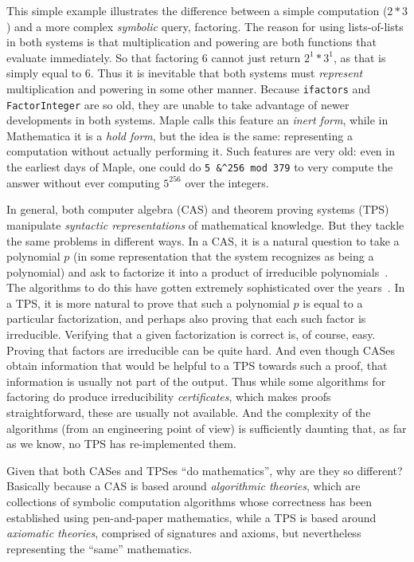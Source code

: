 \documentclass[fleqn]{llncs}
\begin{document}
This simple example illustrates the difference between a simple
computation ($2 * 3$) and a more complex \emph{symbolic} query, factoring.
The reason for using lists-of-lists in both systems is that multiplication
and powering are both functions that evaluate immediately.  So that
factoring 6 cannot just return $2^1 * 3^1$, as that is simply equal to $6$.
Thus it is inevitable that both systems must \emph{represent} multiplication
and powering in some other manner.  Because \texttt{ifactors} and
\texttt{FactorInteger} are so old, they are unable to take advantage of
newer developments in both systems.  Maple calls this feature an
\emph{inert form}, while in Mathematica it is a \emph{hold form}, but
the idea is the same: representing a computation without actually
performing it. Such features are very old: even in the earliest days
of Maple, one could do \texttt{5 \&\textasciicircum 256 mod 379} to
very compute the answer without ever computing $5^{256}$ over the 
integers.

In general, both computer algebra (CAS) and theorem proving systems (TPS)
manipulate \emph{syntactic representations} of mathematical knowledge.  But
they tackle the same problems in different ways. In a CAS, it is a natural
question to take a polynomial $p$ (in some representation that the system
recognizes as being a polynomial) and ask to factorize it into a product of
irreducible polynomials~\cite{von2003modern}.  The algorithms to do this
have gotten extremely sophisticated over the years~\cite{vanhoeij2002}.
In a TPS, it is more natural to prove that such a polynomial $p$ is
equal to a particular factorization, and perhaps also proving that each
such factor is irreducible. Verifying that a given factorization is 
correct is, of course, easy. Proving that factors are irreducible can be
quite hard. And even though CASes obtain information that would be helpful
to a TPS towards such a proof, that information is usually not part of
the output. Thus while some algorithms for factoring do produce irreducibility
\emph{certificates}, which makes proofs straightforward, these are usually
not available. And the complexity of the algorithms (from an engineering
point of view) is sufficiently daunting that, as far as we know, no TPS
has re-implemented them.

Given that both CASes and TPSes ``do mathematics'', why are they so 
different? Basically because a CAS is based around
\emph{algorithmic theories}, which are collections of symbolic computation
algorithms whose correctness has been established using pen-and-paper
mathematics, while a TPS is based around \emph{axiomatic theories},
comprised of signatures and axioms, but nevertheless representing the
``same'' mathematics.
\end{document}
